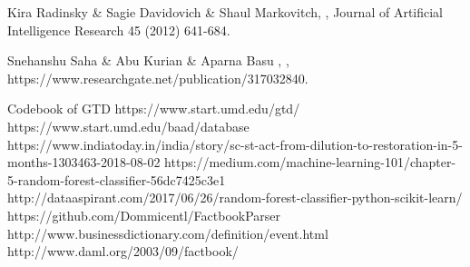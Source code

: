 \documentclass[journal,onecolumn,11pt]{IEEEtran}
\begin{document}
\begin{thebibliography}{1}

Kira Radinsky \& Sagie Davidovich \& Shaul Markovitch, \emph{}, Journal of Artificial Intelligence Research 45 (2012) 641-684.

Snehanshu Saha \& Abu Kurian \& Aparna Basu , \emph{}, https://www.researchgate.net/publication/317032840.

Codebook of GTD
https://www.start.umd.edu/gtd/
https://www.start.umd.edu/baad/database
https://www.indiatoday.in/india/story/sc-st-act-from-dilution-to-restoration-in-5-months-1303463-2018-08-02
https://medium.com/machine-learning-101/chapter-5-random-forest-classifier-56dc7425c3e1
\bibitem{}
http://dataaspirant.com/2017/06/26/random-forest-classifier-python-scikit-learn/
https://github.com/Dommicentl/FactbookParser
http://www.businessdictionary.com/definition/event.html
http://www.daml.org/2003/09/factbook/
\end{thebibliography}
\end{document}
